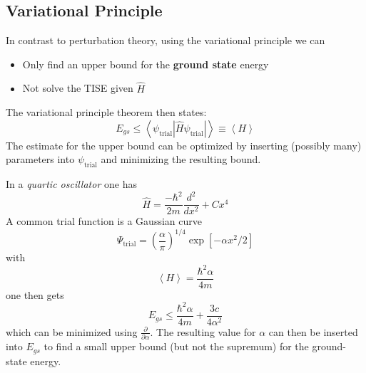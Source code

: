 \subsection{Variational Principle}
In contrast to perturbation theory, using the variational principle we can
\begin{itemize}
    \item Only find an upper bound for the \textbf{ground state} energy
    \item Not solve the TISE given $\hat{H}$
\end{itemize}
The variational principle theorem then states:
\begin{equation*}
    E_{gs}\leq\left\langle\psi_{\mathrm{trial}}\left|\hat{H} \psi_{\mathrm{trial}}\right|\right\rangle \equiv \left<H\right>
\end{equation*}
The estimate for the upper bound can be optimized by inserting (possibly many) parameters into $ \psi_{\mathrm{trial}}$ and minimizing the resulting bound.


\newpar{}

In a \textit{quartic oscillator} one has
\begin{equation*}
    \hat{H}=\frac{-\hbar^{2}}{2m}\frac{d^{2}}{dx^{2}}+Cx^{4}
\end{equation*}
A common trial function is a Gaussian curve
\begin{equation*}
    \Psi_{\mathrm{trial}}={\left(\frac{\alpha}{\pi}\right)}^{1/4}\exp\left[-\alpha x^{2}/2\right]
\end{equation*}
with
\begin{equation*}
    \left<H\right>=\frac{\hbar^2\alpha}{4m}
\end{equation*}
one then gets 
\begin{equation*}
    E_{gs}\leq\frac{\hbar^2\alpha}{4m}+\frac{3c}{4\alpha^2}
\end{equation*}
which can be minimized using $\frac{\partial}{\partial \alpha}$. The resulting value for $\alpha$ can then be inserted into $E_{gs}$ to find a small upper bound (but not the supremum) for the ground-state energy.